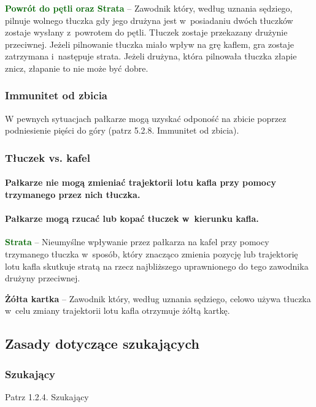 \documentclass[12pt,a4paper]{article}
\newcommand\yellowcard[1]{\bgroup\textcolor{darkyellow}{\textbf{#1}}}
\newcommand\other[1]{\bgroup\textcolor{darkgreen}{\textbf{#1}}}
\begin{document}
\other{Powrót do pętli oraz Strata} -- Zawodnik który, według uznania
sędziego, pilnuje wolnego tłuczka gdy jego drużyna jest w~posiadaniu
dwóch tłuczków zostaje wysłany z~powrotem do pętli. Tłuczek zostaje
przekazany drużynie przeciwnej. Jeżeli pilnowanie tłuczka miało wpływ na
grę kaflem, gra zostaje zatrzymana i~następuje strata. Jeżeli drużyna,
która pilnowała tłuczka złapie znicz, złapanie to nie może być dobre.

\subsubsection{Immunitet od zbicia}

W pewnych sytuacjach pałkarze mogą uzyskać odponość na zbicie poprzez
podniesienie pięści do góry (patrz 5.2.8. Immunitet od zbicia).

\subsubsection{Tłuczek vs. kafel}

\paragraph{Pałkarze nie mogą zmieniać trajektorii lotu kafla przy
	pomocy trzymanego przez nich tłuczka.}

\paragraph{Pałkarze mogą rzucać lub kopać tłuczek w~kierunku
	kafla.}

\other{Strata} -- Nieumyślne wpływanie przez pałkarza na kafel przy pomocy
trzymanego tłuczka w~sposób, który znacząco zmienia pozycję lub
trajektorię lotu kafla skutkuje stratą na rzecz najbliższego
uprawnionego do tego zawodnika drużyny przeciwnej.

\yellowcard{Żółta kartka} -- Zawodnik który, według uznania sędziego, celowo
używa tłuczka w~celu zmiany trajektorii lotu kafla otrzymuje żółtą
kartkę.

\subsection{Zasady dotyczące szukających}

\subsubsection{Szukający}
Patrz 1.2.4. Szukający
\end{document}
